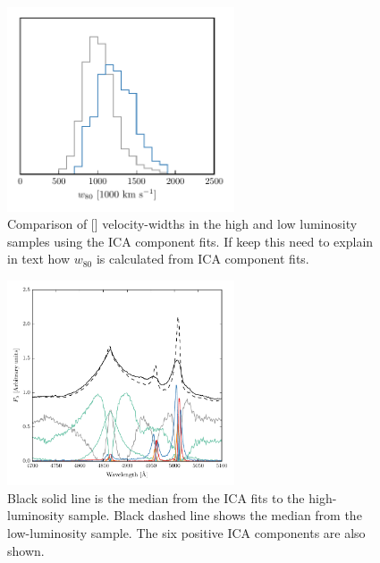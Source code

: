\begin{figure}
    \centering
    \includegraphics[width=0.6\textwidth]{figures/chapter04/mfica_oiii_w80_comparison.pdf} 
    \caption{Comparison of [] velocity-widths in the high and low luminosity samples using the ICA component fits. If keep this need to explain in text how $w_{80}$ is calculated from ICA component fits.}
    \label{fig:mfica_oiii_w80_comparison}
\end{figure}

\begin{figure}
    \centering
    \includegraphics[width=0.6\textwidth]{figures/chapter04/mfica_components.pdf} 
    \caption{Black solid line is the median from the ICA fits to the high-luminosity sample. Black dashed line shows the median from the low-luminosity sample. The six positive ICA components are also shown.}     
    \label{fig:mfica_components}
\end{figure}

